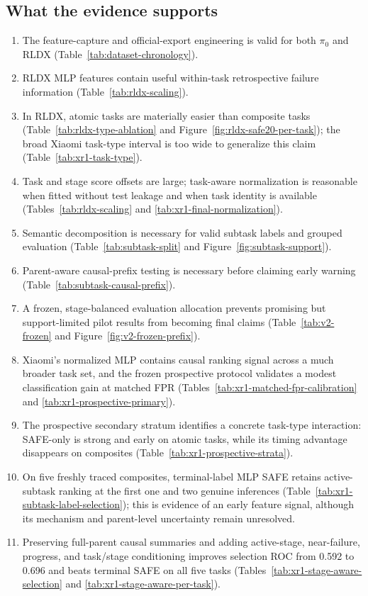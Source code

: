 \documentclass[11pt,a4paper]{article}
\begin{document}
\subsection{What the evidence supports}
\begin{enumerate}
\item The feature-capture and official-export engineering is valid for both
$\pi_0$ and RLDX (Table~\ref{tab:dataset-chronology}).
\item RLDX MLP features contain useful within-task retrospective failure
information (Table~\ref{tab:rldx-scaling}).
\item In RLDX, atomic tasks are materially easier than composite tasks
(Table~\ref{tab:rldx-type-ablation} and
Figure~\ref{fig:rldx-safe20-per-task}); the broad Xiaomi task-type interval is
too wide to generalize this claim (Table~\ref{tab:xr1-task-type}).
\item Task and stage score offsets are large; task-aware normalization is
reasonable when fitted without test leakage and when task identity is
available (Tables~\ref{tab:rldx-scaling} and
\ref{tab:xr1-final-normalization}).
\item Semantic decomposition is necessary for valid subtask labels and grouped
evaluation (Table~\ref{tab:subtask-split} and
Figure~\ref{fig:subtask-support}).
\item Parent-aware causal-prefix testing is necessary before claiming early
warning (Table~\ref{tab:subtask-causal-prefix}).
\item A frozen, stage-balanced evaluation allocation prevents promising but
support-limited pilot results from becoming final claims
(Table~\ref{tab:v2-frozen} and Figure~\ref{fig:v2-frozen-prefix}).
\item Xiaomi's normalized MLP contains causal ranking signal across a much
broader task set, and the frozen prospective protocol validates a modest
classification gain at matched FPR
(Tables~\ref{tab:xr1-matched-fpr-calibration} and
\ref{tab:xr1-prospective-primary}).
\item The prospective secondary stratum identifies a concrete task-type
interaction: SAFE-only is strong and early on atomic tasks, while its timing
advantage disappears on composites
(Table~\ref{tab:xr1-prospective-strata}).
\item On five freshly traced composites, terminal-label MLP SAFE retains
active-subtask ranking at the first one and two genuine inferences
(Table~\ref{tab:xr1-subtask-label-selection}); this is evidence of an early
feature signal, although its mechanism and parent-level uncertainty remain
unresolved.
\item Preserving full-parent causal summaries and adding active-stage,
near-failure, progress, and task/stage conditioning improves selection ROC
from 0.592 to 0.696 and beats terminal SAFE on all five tasks
(Tables~\ref{tab:xr1-stage-aware-selection} and
\ref{tab:xr1-stage-aware-per-task}).
\end{enumerate}
\end{document}
